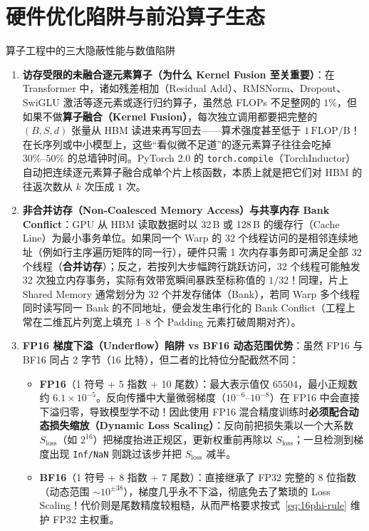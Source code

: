 \section{硬件优化陷阱与前沿算子生态}
\label{sec:hw-pitfalls-ext}

\begin{failBox}{算子工程中的三大隐蔽性能与数值陷阱}
\begin{enumerate}
  \item \textbf{访存受限的未融合逐元素算子（为什么 Kernel Fusion 至关重要）}：在 Transformer 中，诸如残差相加（Residual Add）、RMSNorm、Dropout、SwiGLU 激活等逐元素或逐行归约算子，虽然总 FLOPs 不足整网的 $1\%$，但如果不做\textbf{算子融合（Kernel Fusion）}，每次独立调用都要把完整的 $(B, S, d)$ 张量从 HBM 读进来再写回去——算术强度甚至低于 $1\,\mathrm{FLOP/B}$！在长序列或中小模型上，这些“看似微不足道”的逐元素算子往往会吃掉 $30\%\text{--}50\%$ 的总墙钟时间。PyTorch 2.0 的 \texttt{torch.compile}（TorchInductor）自动把连续逐元素算子融合成单个片上核函数，本质上就是把它们对 HBM 的往返次数从 $k$ 次压成 $1$ 次。
  \item \textbf{非合并访存（Non-Coalesced Memory Access）与共享内存 Bank Conflict}：GPU 从 HBM 读取数据时以 32\,B 或 128\,B 的缓存行（Cache Line）为最小事务单位。如果同一个 Warp 的 32 个线程访问的是相邻连续地址（例如行主序遍历矩阵的同一行），硬件只需 1 次内存事务即可满足全部 32 个线程（\textbf{合并访存}）；反之，若按列大步幅跨行跳跃访问，32 个线程可能触发 32 次独立内存事务，实际有效带宽瞬间暴跌至标称值的 $1/32$！同理，片上 Shared Memory 通常划分为 32 个并发存储体（Bank），若同 Warp 多个线程同时读写同一 Bank 的不同地址，便会发生串行化的 Bank Conflict（工程上常在二维瓦片列宽上填充 1--8 个 Padding 元素打破周期对齐）。
  \item \textbf{FP16 梯度下溢（Underflow）陷阱 vs BF16 动态范围优势}：虽然 FP16 与 BF16 同占 2 字节（16 比特），但二者的比特位分配截然不同：
  \begin{itemize}
    \item \textbf{FP16}（1 符号 + 5 指数 + 10 尾数）：最大表示值仅 $65504$，最小正规数约 $6.1\times 10^{-5}$。反向传播中大量微弱梯度（$10^{-6}\text{--}10^{-8}$）在 FP16 中会直接下溢归零，导致模型学不动！因此使用 FP16 混合精度训练时\textbf{必须配合动态损失缩放（Dynamic Loss Scaling）}：反向前把损失乘以一个大系数 $S_{\mathrm{loss}}$（如 $2^{16}$）把梯度抬进正规区，更新权重前再除以 $S_{\mathrm{loss}}$；一旦检测到梯度出现 \texttt{Inf/NaN} 则跳过该步并把 $S_{\mathrm{loss}}$ 减半。
    \item \textbf{BF16}（1 符号 + 8 指数 + 7 尾数）：直接继承了 FP32 完整的 8 位指数（动态范围 $\sim 10^{\pm 38}$），梯度几乎永不下溢，彻底免去了繁琐的 Loss Scaling！代价则是尾数精度较粗糙，从而严格要求按式~\eqref{eq:16phi-rule} 维护 FP32 主权重。
  \end{itemize}
\end{enumerate}
\end{failBox}

